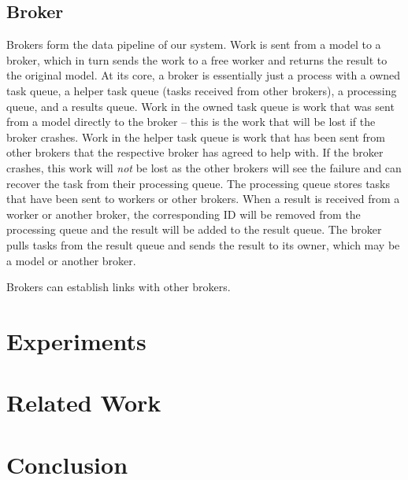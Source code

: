 \documentclass[conference]{IEEEtran}
\begin{document}
\subsection{Broker}
Brokers form the data pipeline of our system. Work is sent from a model to a broker,
which in turn sends the work to a free worker and returns the result to the original
model. At its core, a broker is essentially just a process with a owned task queue,
a helper task queue (tasks received from other brokers), a processing queue, and
a results queue. Work in the owned task queue is work that was sent from a model directly
to the broker -- this is the work that will be lost if the broker crashes. Work in
the helper task queue is work that has been sent from other brokers that the respective
broker has agreed to help with. If the broker crashes, this work will \emph{not} be
lost as the other brokers will see the failure and can recover the task from their
processing queue. The processing queue stores tasks that have been sent to
workers or other brokers. When a result is received from a worker or another broker,
the corresponding ID will be removed from the processing queue and the result will
be added to the result queue. The broker pulls tasks from the result queue and sends
the result to its owner, which may be a model or another broker.

Brokers can establish links with other brokers.


\section{Experiments}

\section{Related Work}

\section{Conclusion}



\end{document}
